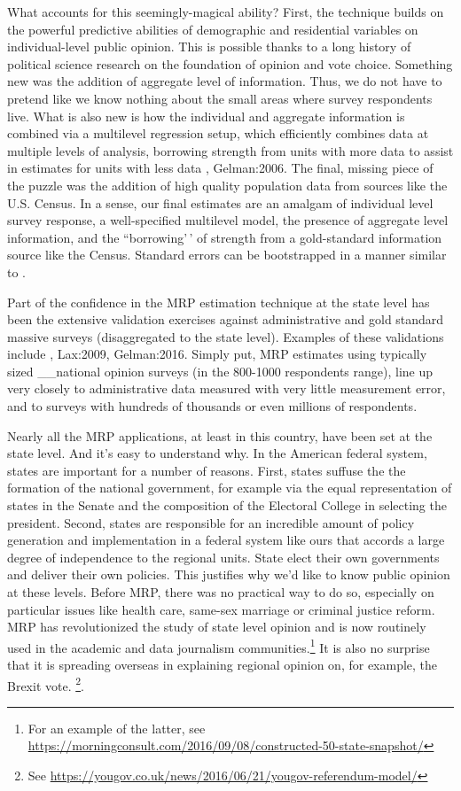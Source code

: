 \documentclass[
  oneside]{book}
\begin{document}
What accounts for this seemingly-magical ability? First, the technique builds on the powerful predictive abilities of demographic and residential variables on individual-level public opinion. This is possible thanks to a long history of political science research on the foundation of opinion and vote choice. Something new was the addition of aggregate level of information. Thus, we do not have to pretend like we know nothing about the small areas where survey respondents live. What is also new is how the individual and aggregate information is combined via a multilevel regression setup, which efficiently combines data at multiple levels of analysis, borrowing strength from units with more data to assist in estimates for units with less data \citet{Raudenbush:2002}, Gelman:2006. The final, missing piece of the puzzle was the addition of high quality population data from sources like the U.S. Census. In a sense, our final estimates are an amalgam of individual level survey response, a well-specified multilevel model, the presence of aggregate level information, and the ``borrowing'\,' of strength from a gold-standard information source like the Census. Standard errors can be bootstrapped in a manner similar to \citet{Kastellec:2015}.

Part of the confidence in the MRP estimation technique at the state level has been the extensive validation exercises against administrative and gold standard massive surveys (disaggregated to the state level). Examples of these validations include \citet{Park:2004}, Lax:2009, Gelman:2016. Simply put, MRP estimates using typically sized \_\_national opinion surveys (in the 800-1000 respondents range), line up very closely to administrative data measured with very little measurement error, and to surveys with hundreds of thousands or even millions of respondents.

Nearly all the MRP applications, at least in this country, have been set at the state level. And it's easy to understand why. In the American federal system, states are important for a number of reasons. First, states suffuse the the formation of the national government, for example via the equal representation of states in the Senate and the composition of the Electoral College in selecting the president. Second, states are responsible for an incredible amount of policy generation and implementation in a federal system like ours that accords a large degree of independence to the regional units. State elect their own governments and deliver their own policies. This justifies why we'd like to know public opinion at these levels. Before MRP, there was no practical way to do so, especially on particular issues like health care, same-sex marriage or criminal justice reform. MRP has revolutionized the study of state level opinion and is now routinely used in the academic and data journalism communities.\footnote{For an example of the latter, see \url{https://morningconsult.com/2016/09/08/constructed-50-state-snapshot/}} It is also no surprise that it is spreading overseas in explaining regional opinion on, for example, the Brexit vote. \footnote{See \url{https://yougov.co.uk/news/2016/06/21/yougov-referendum-model/}}.
\end{document}
